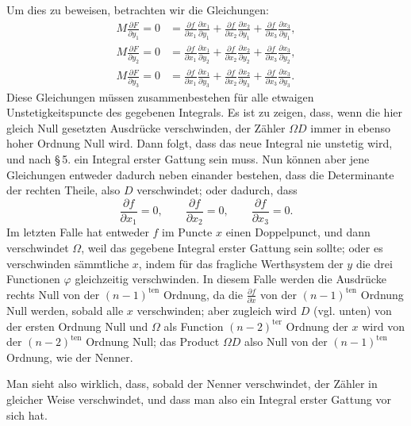 \documentclass[10pt]{article}
\begin{document}
Um dies zu beweisen, betrachten wir die Gleichungen:
\[
\begin{aligned}
M\frac{\partial F}{\partial y_1}=0
&=\frac{\partial f}{\partial x_1}\frac{\partial x_1}{\partial y_1}
+\frac{\partial f}{\partial x_2}\frac{\partial x_2}{\partial y_1}
+\frac{\partial f}{\partial x_3}\frac{\partial x_3}{\partial y_1},\\
M\frac{\partial F}{\partial y_2}=0
&=\frac{\partial f}{\partial x_1}\frac{\partial x_1}{\partial y_2}
+\frac{\partial f}{\partial x_2}\frac{\partial x_2}{\partial y_2}
+\frac{\partial f}{\partial x_3}\frac{\partial x_3}{\partial y_2},\\
M\frac{\partial F}{\partial y_3}=0
&=\frac{\partial f}{\partial x_1}\frac{\partial x_1}{\partial y_3}
+\frac{\partial f}{\partial x_2}\frac{\partial x_2}{\partial y_3}
+\frac{\partial f}{\partial x_3}\frac{\partial x_3}{\partial y_3}.
\end{aligned}
\]
Diese Gleichungen müssen zusammenbestehen für alle etwaigen Unstetigkeitspuncte des gegebenen Integrals. Es ist zu zeigen, dass, wenn die hier gleich Null gesetzten Ausdrücke verschwinden, der Zähler \(\Omega D\) immer in ebenso hoher Ordnung Null wird. Dann folgt, dass das neue Integral nie unstetig wird, und nach \S\,5. ein Integral erster Gattung sein muss. Nun können aber jene Gleichungen entweder dadurch neben einander bestehen, dass die Determinante der rechten Theile, also \(D\) verschwindet; oder dadurch, dass
\[
\frac{\partial f}{\partial x_1}=0,\qquad
\frac{\partial f}{\partial x_2}=0,\qquad
\frac{\partial f}{\partial x_3}=0.
\]
Im letzten Falle hat entweder \(f\) im Puncte \(x\) einen Doppelpunct, und dann verschwindet \(\Omega\), weil das gegebene Integral erster Gattung sein sollte; oder es verschwinden sämmtliche \(x\), indem für das fragliche Werthsystem der \(y\) die drei Functionen \(\varphi\) gleichzeitig verschwinden. In diesem Falle werden die Ausdrücke rechts Null von der \((n-1)^{\text{ten}}\) Ordnung, da die \(\frac{\partial f}{\partial x}\) von der \((n-1)^{\text{ten}}\) Ordnung Null werden, sobald alle \(x\) verschwinden; aber zugleich wird \(D\) (vgl. unten) von der ersten Ordnung Null und \(\Omega\) als Function \((n-2)^{\text{ter}}\) Ordnung der \(x\) wird von der \((n-2)^{\text{ten}}\) Ordnung Null; das Product \(\Omega D\) also Null von der \((n-1)^{\text{ten}}\) Ordnung, wie der Nenner.

Man sieht also wirklich, dass, sobald der Nenner verschwindet, der Zähler in gleicher Weise verschwindet, und dass man also ein Integral erster Gattung vor sich hat.
\end{document}
